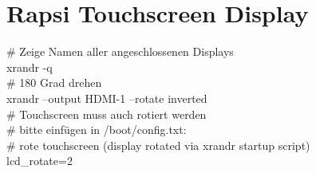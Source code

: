 \newpage
\section{Rapsi Touchscreen Display}

\# Zeige Namen aller angeschlossenen Displays\\
xrandr -q\\

\# 180 Grad drehen\\
xrandr --output HDMI-1 --rotate inverted\\

\# Touchscreen muss auch rotiert werden\\
\# bitte einfügen in /boot/config.txt:\\
\# rote touchscreen (display rotated via xrandr startup script)\\
lcd\_rotate=2\\


